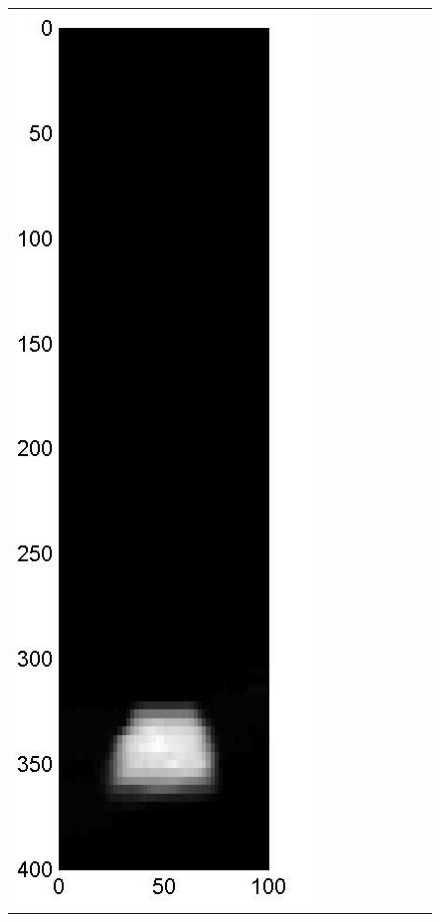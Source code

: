 \documentclass[english]{siamltex}
\begin{document}
{\begin{figure}[!h]
\begin{center}
\begin{tabular}{|c|c|c|c|c|c|c|c|c|}
			\includegraphics[width=.9\iwidth]{figures/newFigs/noisy/resultsExp-8-mkTV}
			&

\end{tabular}
\end{center}
\end{figure}}
\end{document}
